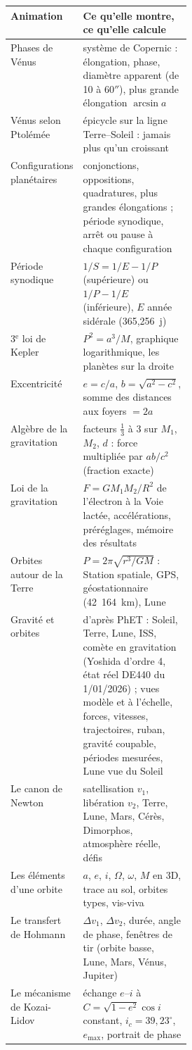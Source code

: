 \begin{center}
\small
\begin{tabularx}{\linewidth}{@{}>{\raggedright}p{0.30\linewidth}X@{}}
\toprule
Animation & Ce qu'elle montre, ce qu'elle calcule\\
\midrule
Phases de Vénus & système de Copernic : élongation, phase, diamètre apparent (de 10 à 60$''$), plus grande élongation $\arcsin a$\\
Vénus selon Ptolémée & épicycle sur la ligne Terre--Soleil : jamais plus qu'un croissant\\
Configurations planétaires & conjonctions, oppositions, quadratures, plus grandes élongations ; période synodique, arrêt ou pause à chaque configuration\\
Période synodique & $1/S=1/E-1/P$ (supérieure) ou $1/P-1/E$ (inférieure), $E$ année sidérale (365,256~j)\\
3$^\text{e}$ loi de Kepler & $P^2=a^3/M$, graphique logarithmique, les planètes sur la droite\\
Excentricité & $e=c/a$, $b=\sqrt{a^2-c^2}$, somme des distances aux foyers $=2a$\\
Algèbre de la gravitation & facteurs $\frac13$ à 3 sur $M_1$, $M_2$, $d$ : force multipliée par $ab/c^2$ (fraction exacte)\\
Loi de la gravitation & $F=GM_1M_2/R^2$ de l'électron à la Voie lactée, accélérations, préréglages, mémoire des résultats\\
Orbites autour de la Terre & $P=2\pi\sqrt{r^3/GM}$ : Station spatiale, GPS, géostationnaire (42~164~km), Lune\\
Gravité et orbites & d'après PhET : Soleil, Terre, Lune, ISS, comète en gravitation (Yoshida d'ordre 4, état réel DE440 du 1/01/2026) ; vues modèle et à l'échelle, forces, vitesses, trajectoires, ruban, gravité coupable, périodes mesurées, Lune vue du Soleil\\
Le canon de Newton & satellisation $v_1$, libération $v_2$, Terre, Lune, Mars, Cérès, Dimorphos, atmosphère réelle, défis\\
Les éléments d'une orbite & $a$, $e$, $i$, $\Omega$, $\omega$, $M$ en 3D, trace au sol, orbites types, vis-viva\\
Le transfert de Hohmann & $\Delta v_1$, $\Delta v_2$, durée, angle de phase, fenêtres de tir (orbite basse, Lune, Mars, Vénus, Jupiter)\\
Le mécanisme de Kozai-Lidov & échange $e$--$i$ à $C=\sqrt{1-e^2}\cos i$ constant, $i_c=39{,}23^\circ$, $e_\text{max}$, portrait de phase\\

\end{tabularx}
\end{center}
